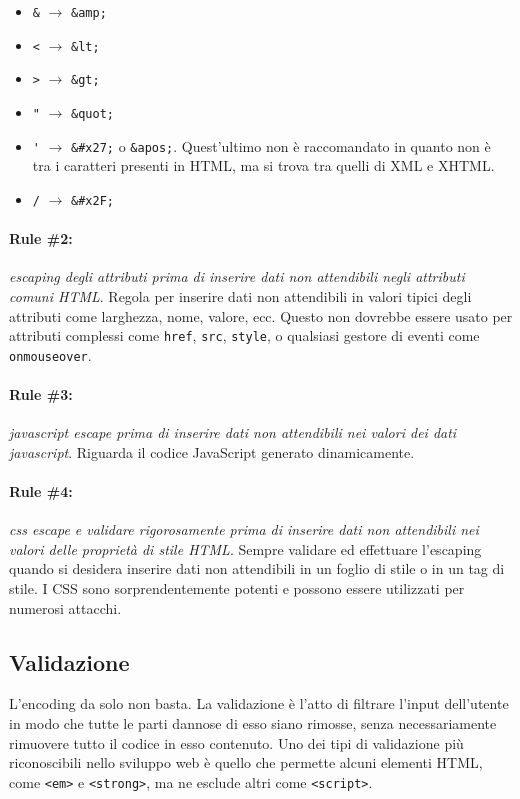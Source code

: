 \begin{itemize}
      \item \verb|&| $\rightarrow$ \verb|&amp;|
      \item \verb|<| $\rightarrow$ \verb|&lt;|
      \item \verb|>| $\rightarrow$ \verb|&gt;|
      \item \verb|"| $\rightarrow$ \verb|&quot;|
      \item \verb|'| $\rightarrow$ \verb|&#x27;| o \verb|&apos;|. Quest'ultimo
            non è raccomandato in quanto non è tra i caratteri presenti in HTML, ma si trova
            tra quelli di XML e XHTML.
      \item \verb|/| $\rightarrow$ \verb|&#x2F;|
\end{itemize}

\vspace{-0.5em}

\paragraph{Rule \#2:} \textit{escaping degli attributi prima di inserire dati non
      attendibili negli attributi comuni HTML}.
Regola per inserire dati non attendibili in valori tipici degli attributi come
larghezza, nome,
valore, ecc. Questo non dovrebbe essere usato per attributi complessi come
\verb|href|, \verb|src|, \verb|style|,
o qualsiasi gestore di eventi come \verb|onmouseover|.

\vspace{-0.5em}

\paragraph{Rule \#3:} \textit{javascript escape prima di inserire dati non attendibili
      nei valori dei dati javascript}.
Riguarda il codice JavaScript generato dinamicamente.

\vspace{-0.5em}

\paragraph{Rule \#4:} \textit{css escape e validare rigorosamente prima di inserire
      dati non attendibili nei valori delle proprietà di stile HTML}.
Sempre validare ed effettuare l'escaping quando si desidera inserire dati non
attendibili in un foglio di stile o in un
tag di stile. I CSS
sono sorprendentemente potenti e possono essere utilizzati per numerosi attacchi.

\subsection{Validazione}

L'encoding da solo non basta.
La validazione è l'atto di filtrare l'input dell'utente in modo che tutte le
parti dannose di esso
siano rimosse, senza necessariamente rimuovere tutto il codice in esso contenuto.
Uno dei
tipi di validazione più riconoscibili nello sviluppo web è quello che permette
alcuni elementi
HTML, come \verb|<em>| e \verb|<strong>|, ma ne esclude altri come \verb|<script>|.